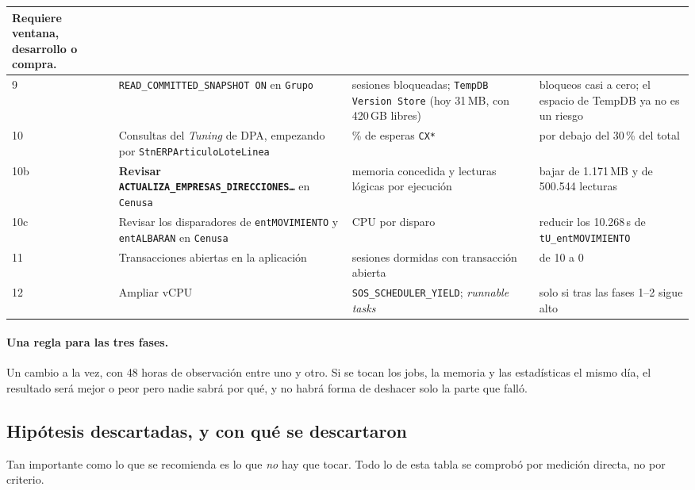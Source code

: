 \documentclass[11pt,a4paper]{article}
\newcommand{\cod}[1]{\texttt{\small #1}}
\begin{document}
\begin{longtable}{p{0.4cm}p{5.1cm}p{4.2cm}p{4.3cm}}
{Requiere ventana, desarrollo o compra.} \\
\midrule
9 & \cod{READ\_COMMITTED\_SNAPSHOT ON} en \cod{Grupo}
  & sesiones bloqueadas; \cod{TempDB Version Store} (hoy 31\,MB, con 420\,GB
    libres)
  & bloqueos casi a cero; el espacio de TempDB ya no es un riesgo \\
10 & Consultas del \emph{Tuning} de DPA, empezando por
     \cod{StnERPArticuloLoteLinea}
  & \% de esperas \cod{CX*}
  & por debajo del 30\,\% del total \\
10b & \textbf{Revisar \cod{ACTUALIZA\_EMPRESAS\_DIRECCIONES\ldots}} en
      \cod{Cenusa}
  & memoria concedida y lecturas lógicas por ejecución
  & bajar de 1.171\,MB y de 500.544 lecturas \\
10c & Revisar los disparadores de \cod{entMOVIMIENTO} y \cod{entALBARAN}
      en \cod{Cenusa}
  & CPU por disparo
  & reducir los 10.268\,s de \cod{tU\_entMOVIMIENTO} \\
11 & Transacciones abiertas en la aplicación
  & sesiones dormidas con transacción abierta
  & de 10 a 0 \\
12 & Ampliar vCPU
  & \cod{SOS\_SCHEDULER\_YIELD}; \emph{runnable tasks}
  & solo si tras las fases 1--2 sigue alto \\
\bottomrule
\end{longtable}

\paragraph{Una regla para las tres fases.} Un cambio a la vez, con 48 horas de
observación entre uno y otro. Si se tocan los jobs, la memoria y las
estadísticas el mismo día, el resultado será mejor o peor pero nadie sabrá por
qué, y no habrá forma de deshacer solo la parte que falló.

\subsection{Hipótesis descartadas, y con qué se descartaron}

Tan importante como lo que se recomienda es lo que \emph{no} hay que tocar.
Todo lo de esta tabla se comprobó por medición directa, no por criterio.
\end{document}

